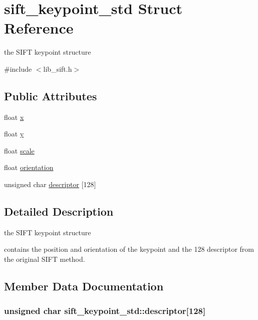 \hypertarget{structsift__keypoint__std}{}\section{sift\+\_\+keypoint\+\_\+std Struct Reference}
\label{structsift__keypoint__std}


the S\+I\+F\+T keypoint structure  




{\ttfamily \#include $<$lib\+\_\+sift.\+h$>$}

\subsection*{Public Attributes}
\begin{DoxyCompactItemize}
\item 
float \hyperlink{structsift__keypoint__std_ab3cf39ec4cada825754a69652dc112a4}{x}
\item 
float \hyperlink{structsift__keypoint__std_abeeba76576b2f6987cfef077385fdb38}{y}
\item 
float \hyperlink{structsift__keypoint__std_a6ed987c3fa9393bbb3ab906e566c1530}{scale}
\item 
float \hyperlink{structsift__keypoint__std_a051615675ebd98b52a13c7f6503bf6b9}{orientation}
\item 
unsigned char \hyperlink{structsift__keypoint__std_a47853d76d2e02c63b96a577dd1454e04}{descriptor} \mbox{[}128\mbox{]}
\end{DoxyCompactItemize}


\subsection{Detailed Description}
the S\+I\+F\+T keypoint structure 

contains the position and orientation of the keypoint and the 128 descriptor from the original S\+I\+F\+T method. 

\subsection{Member Data Documentation}
\hypertarget{structsift__keypoint__std_a47853d76d2e02c63b96a577dd1454e04}{}
\subsubsection[{descriptor}]{\setlength{\rightskip}{0pt plus 5cm}unsigned char sift\+\_\+keypoint\+\_\+std\+::descriptor\mbox{[}128\mbox{]}}\label{structsift__keypoint__std_a47853d76d2e02c63b96a577dd1454e04}
\hypertarget{structsift__keypoint__std_a051615675ebd98b52a13c7f6503bf6b9}{}
